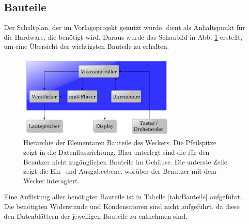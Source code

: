 \documentclass[journal, a4paper]{IEEEtran}
\begin{document}
	\subsection{Bauteile}
		\label{sc:Hardware:subsc:Bauteile}
		Der Schaltplan, der im Vorlageprojekt genutzt wurde, dient als Anhaltspunkt für die Hardware, die benötigt wird. Daraus wurde das Schaubild in Abb. \ref{fig:Hierarchie} erstellt, um eine Übersicht der wichtigsten Bauteile zu erhalten.
		\begin{figure}
				\includegraphics[width=80mm]{./Grafiken/Hierarchie}
				\caption{Hierarchie der Elementaren Bauteile des Weckers. Die Pfeilspitze zeigt in die Datenflussrichtung. Blau unterlegt sind die für den Benutzer nicht zugänglichen Bauteile im Gehäuse. Die unterste Zeile zeigt die Ein- und Ausgabeebene, worüber der Benutzer mit dem Wecker interagiert.}
				\label{fig:Hierarchie}
		\end{figure} 
		Eine Auflistung aller benötigter Bauteile ist in Tabelle \ref{tab:Bauteile} aufgeführt. Die benötigten Widerstände und Kondensatoren sind nicht aufgeführt, da diese den Datenblättern der jeweiligen Bauteile zu entnehmen sind. 
\end{document}
